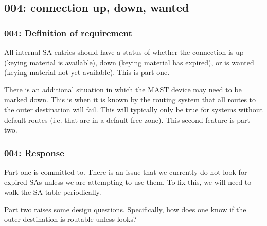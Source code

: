 \subsection{004: connection up, down, wanted}

\subsubsection{004: Definition of requirement }

All internal SA entries should have a status of whether the connection is up
(keying material is available), down (keying material has expired), or is
wanted (keying material not yet available). This is part one.

There is an additional situation in which the MAST device may need to be
marked down. This is when it is known by the routing system that all routes
to the outer destination will fail. This will typically only be true for
systems without default routes (i.e. that are in a default-free zone). This
second feature is part two.

\subsubsection{004: Response}

Part one is committed to. There is an issue that we currently do not 
look for expired SAs unless we are attempting to use them. To fix this,
we will need to walk the SA table periodically. 

Part two raises some design questions. Specifically, how does one know if
the outer destination is routable unless looks?

